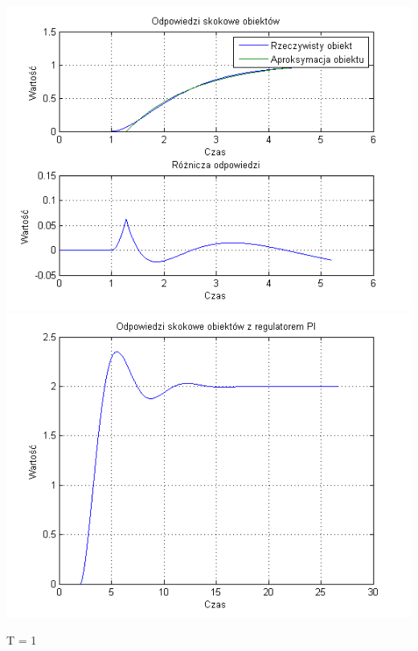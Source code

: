 \documentclass[10pt,a4paper]{article}
\begin{document}
\begin{center}
\includegraphics[scale=1]{images/jeden/skrypt_57.png}\\
\includegraphics[scale=1]{images/jeden/skrypt_58.png}\\
\end{center}
\newpage
T = 1
\end{document}
